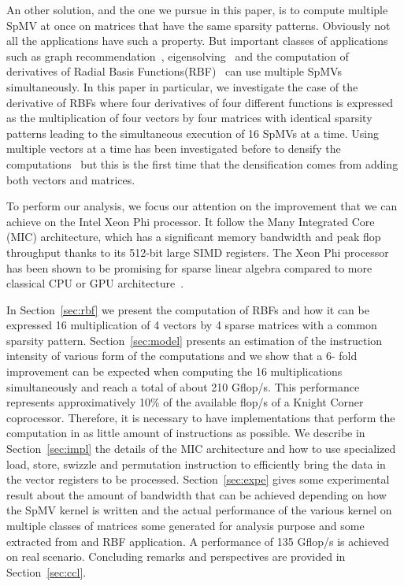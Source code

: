 \documentclass[10pt,conference,compsocconf]{IEEEtran}
\begin{document}
An other solution, and the one we pursue in this paper, is to compute
multiple SpMV at once on matrices that have the same sparsity
patterns. Obviously not all the applications have such a property. But
important classes of applications such as graph
recommendation~\cite{Kucuktunc13-SNAM}, eigensolving~\cite{LOBPCG} and the computation of
derivatives of Radial Basis Functions(RBF)~\cite{FLBWSC12} can use multiple
SpMVs simultaneously. In this paper in particular, we investigate the
case of the derivative of RBFs where four derivatives of four
different functions is expressed as the multiplication of four vectors
by four matrices with identical sparsity patterns leading to the
simultaneous execution of 16 SpMVs at a time. Using multiple vectors
at a time has been investigated before to densify the
computations~\cite{Im01} but this is the first time that the
densification comes from adding both vectors and matrices.

To perform our analysis, we focus our attention on the improvement
that we can achieve on the Intel Xeon Phi processor. It follow the
Many Integrated Core (MIC) architecture, which has a significant
memory bandwidth and peak flop throughput thanks to its 512-bit large
SIMD registers. The Xeon Phi processor has been shown to be promising
for sparse linear algebra compared to more classical CPU or GPU
architecture~\cite{Saule13-ARXIV, Liu:2013:ESM:2464996.2465013, cramer2012openmp}.

In Section~\ref{sec:rbf} we present the computation of RBFs and how it
can be expressed 16 multiplication of 4 vectors by 4 sparse matrices
with a common sparsity pattern. Section~\ref{sec:model} presents an
estimation of the instruction intensity of various form of the
computations and we show that a 6- fold improvement can be
expected when computing the 16 multiplications simultaneously and
reach a total of about 210 Gflop/s. This performance represents
approximatively 10\% of the available flop/s of a Knight Corner
coprocessor. Therefore, it is necessary to have implementations that
perform the computation in as little amount of instructions as
possible. We describe in Section~\ref{sec:impl} the details of the MIC
architecture and how to use specialized load, store, swizzle and
permutation instruction to efficiently bring the data in the vector
registers to be processed. Section~\ref{sec:expe} gives some
experimental result about the amount of bandwidth that can be achieved
depending on how the SpMV kernel is written and the actual performance
of the various kernel on multiple classes of matrices some generated
for analysis purpose and some extracted from and RBF application. A
performance of 135 Gflop/s is achieved on real scenario. Concluding
remarks and perspectives are provided in Section~\ref{sec:ccl}.
\end{document}
